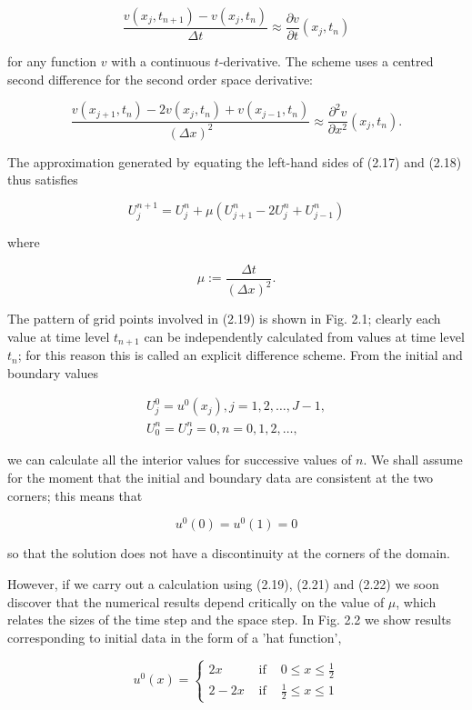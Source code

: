 \documentclass[10pt]{article}
\begin{document}
\[
\frac{v\left(x_{j}, t_{n+1}\right)-v\left(x_{j}, t_{n}\right)}{\Delta t} \approx \frac{\partial v}{\partial t}\left(x_{j}, t_{n}\right)
\]

for any function \(v\) with a continuous \(t\)-derivative. The scheme uses a centred second difference for the second order space derivative:

\[
\frac{v\left(x_{j+1}, t_{n}\right)-2 v\left(x_{j}, t_{n}\right)+v\left(x_{j-1}, t_{n}\right)}{(\Delta x)^{2}} \approx \frac{\partial^{2} v}{\partial x^{2}}\left(x_{j}, t_{n}\right) .
\]

The approximation generated by equating the left-hand sides of (2.17) and (2.18) thus satisfies

\[
U_{j}^{n+1}=U_{j}^{n}+\mu\left(U_{j+1}^{n}-2 U_{j}^{n}+U_{j-1}^{n}\right)
\]

where

\[
\mu:=\frac{\Delta t}{(\Delta x)^{2}} .
\]

The pattern of grid points involved in (2.19) is shown in Fig. 2.1; clearly each value at time level \(t_{n+1}\) can be independently calculated from values at time level \(t_{n}\); for this reason this is called an explicit difference scheme. From the initial and boundary values

\[
\begin{gathered}
U_{j}^{0}=u^{0}\left(x_{j}\right), j=1,2, \ldots, J-1, \\
U_{0}^{n}=U_{J}^{n}=0, n=0,1,2, \ldots,
\end{gathered}
\]

we can calculate all the interior values for successive values of \(n\). We shall assume for the moment that the initial and boundary data are consistent at the two corners; this means that

\[
u^{0}(0)=u^{0}(1)=0
\]

so that the solution does not have a discontinuity at the corners of the domain.

However, if we carry out a calculation using (2.19), (2.21) and (2.22) we soon discover that the numerical results depend critically on the value of \(\mu\), which relates the sizes of the time step and the space step. In Fig. 2.2 we show results corresponding to initial data in the form of a 'hat function',

\[
u^{0}(x)=\left\{\begin{array}{lll}
2 x & \text { if } & 0 \leq x \leq \frac{1}{2} \\
2-2 x & \text { if } & \frac{1}{2} \leq x \leq 1
\end{array}\right.
\]
\end{document}
